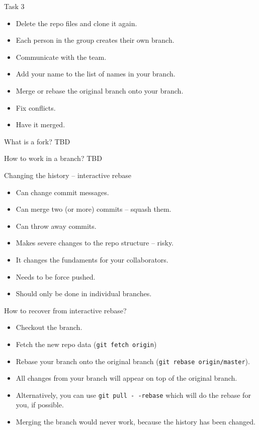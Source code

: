 \documentclass[14pt]{beamer}
\begin{document}
	\begin{frame}{Task 3}
	\begin{itemize}
		\item Delete the repo files and clone it again.
		\item Each person in the group creates their own branch.
		\item Communicate with the team.
		\item Add your name to the list of names in your branch.
		\item Merge or rebase the original branch onto your branch.
		\item Fix conflicts.
		\item Have it merged.
	\end{itemize}
	\end{frame}


 \begin{frame}{What is a fork?}
 	TBD
 \end{frame}

\begin{frame}{How to work in a branch?}
	TBD
\end{frame}

	\begin{frame}{Changing the history -- interactive rebase}
	\begin{itemize}
		\item Can change commit messages.
		\item Can merge two (or more) commits -- squash them.
		\item Can throw away commits.
		\item Makes severe changes to the repo structure -- risky.
		\item It changes the fundaments for your collaborators.
		\item Needs to be force pushed.
		\item Should only be done in individual branches.
	\end{itemize}
\end{frame}

	\begin{frame}{How to recover from interactive rebase?}
	\begin{itemize}
		\item Checkout the branch.
		\item Fetch the new repo data (\texttt{git fetch origin})
		\item Rebase your branch onto the original branch (\texttt{git rebase origin/master}).
		\item All changes from your branch will appear on top of the original branch.
		\item Alternatively, you can use \texttt{git pull -\,-rebase} which will do the rebase for you, if possible.
		\item Merging the branch would never work, because the history has been changed.
	\end{itemize}
\end{frame}
\end{document}
